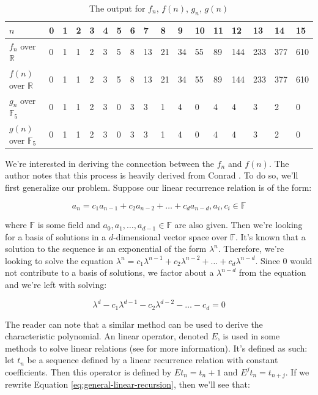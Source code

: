 \documentclass[a4paper]{article}
\theoremstyle{definition}
\begin{document}
\begin{table}[ht]
\centering
\begin{tabular}{|l|l|l|l|l|l|l|l|l|l|l|l|l|l|l|l|l|}
\hline
$n$ & 0 & 1 & 2 & 3 & 4 & 5 & 6 & 7 & 8 & 9 & 10 & 11 & 12 & 13 & 14 & 15 \\ \hline
$f_n$ over $\mathbb{R}$ & 0 & 1 & 1 & 2 & 3 & 5 & 8 & 13 & 21 & 34 & 55 & 89 & 144 & 233 & 377 & 610 \\ \hline
$f(n)$ over $\mathbb{R}$ & 0 & 1 & 1 & 2 & 3 & 5 & 8 & 13 & 21 & 34 & 55 & 89 & 144 & 233 & 377 & 610 \\ \hline
$g_n$ over $\mathbb{F}_5$ & 0 & 1 & 1 & 2 & 3 & 0 & 3 & 3 & 1 & 4 & 0 & 4 & 4 & 3 & 2 & 0 \\ \hline
$g(n)$ over $\mathbb{F}_5$ & 0 & 1 & 1 & 2 & 3 & 0 & 3 & 3 & 1 & 4 & 0 & 4 & 4 & 3 & 2 & 0 \\ \hline
\end{tabular}
\caption{The output for $f_n$, $f(n)$, $g_n$, $g(n)$}
\label{tab:fib-output}
\end{table}

We're interested in deriving the connection between the $f_n$ and $f(n)$. The author notes that this
process is heavily derived from Conrad \cite{bib:solve-lin-rec-field}. To do so, we'll first generalize
our problem. Suppose our linear recurrence relation is of the form:

\begin{equation}
a_n=c_1a_{n-1}+c_2a_{n-2}+\ldots+c_da_{n-d}, a_i, c_i \in \mathbb{F}
\label{eq:general-linear-recursion}
\end{equation}

where $\mathbb{F}$ is some field and $a_0, a_1, \ldots, a_{d-1} \in \mathbb{F}$ are also given. Then
we're looking for a basis of solutions in a $d$-dimensional vector space over $\mathbb{F}$. It's known
that a solution to the sequence is an exponential of the form $\lambda^n$\cite{bib:solve-lin-rec-field}.
Therefore, we're looking to solve the equation
$\lambda^n=c_1\lambda^{n-1}+c_2\lambda^{n-2}+\ldots+c_d\lambda^{n-d}$. Since $0$ would not contribute to
a basis of solutions, we factor about a $\lambda^{n-d}$ from the equation and we're left with solving:

\begin{equation}
\lambda^d-c_1\lambda^{d-1}-c_2\lambda^{d-2}-\ldots-c_d=0
\label{eq:char-poly}
\end{equation}

The reader can note that a similar method can be used to derive the characteristic polynomial. An linear
operator, denoted $E$, is used in some methods to solve linear relations (see
\cite{bib:successor-explained} for more information). It's defined as such: let $t_n$ be a sequence
defined by a linear recurrence relation with constant coefficients. Then this operator is defined by
$Et_n=t_n+1$ and $E^jt_n=t_{n+j}$\cite{bib:gen_cond_rec}. If we rewrite Equation
\ref{eq:general-linear-recursion}, then we'll see that:
\end{document}
